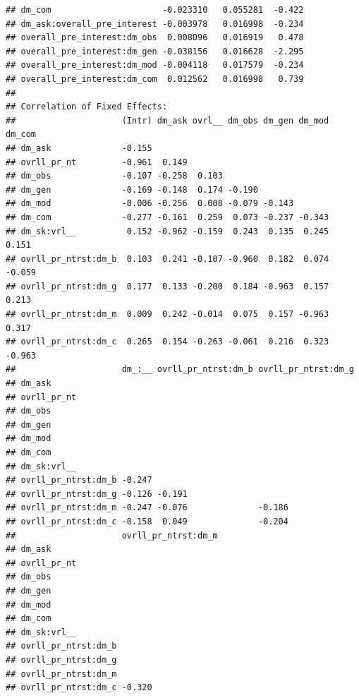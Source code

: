 \documentclass[]{msu-thesis}
\theoremstyle{definition}
\theoremstyle{definition}
\theoremstyle{definition}
\theoremstyle{remark}
\begin{document}
\begin{verbatim}
## dm_com                      -0.023310   0.055281  -0.422
## dm_ask:overall_pre_interest -0.003978   0.016998  -0.234
## overall_pre_interest:dm_obs  0.008096   0.016919   0.478
## overall_pre_interest:dm_gen -0.038156   0.016628  -2.295
## overall_pre_interest:dm_mod -0.004118   0.017579  -0.234
## overall_pre_interest:dm_com  0.012562   0.016998   0.739
## 
## Correlation of Fixed Effects:
##                     (Intr) dm_ask ovrl__ dm_obs dm_gen dm_mod dm_com
## dm_ask              -0.155                                          
## ovrll_pr_nt         -0.961  0.149                                   
## dm_obs              -0.107 -0.258  0.103                            
## dm_gen              -0.169 -0.148  0.174 -0.190                     
## dm_mod              -0.006 -0.256  0.008 -0.079 -0.143              
## dm_com              -0.277 -0.161  0.259  0.073 -0.237 -0.343       
## dm_sk:vrl__          0.152 -0.962 -0.159  0.243  0.135  0.245  0.151
## ovrll_pr_ntrst:dm_b  0.103  0.241 -0.107 -0.960  0.182  0.074 -0.059
## ovrll_pr_ntrst:dm_g  0.177  0.133 -0.200  0.184 -0.963  0.157  0.213
## ovrll_pr_ntrst:dm_m  0.009  0.242 -0.014  0.075  0.157 -0.963  0.317
## ovrll_pr_ntrst:dm_c  0.265  0.154 -0.263 -0.061  0.216  0.323 -0.963
##                     dm_:__ ovrll_pr_ntrst:dm_b ovrll_pr_ntrst:dm_g
## dm_ask                                                            
## ovrll_pr_nt                                                       
## dm_obs                                                            
## dm_gen                                                            
## dm_mod                                                            
## dm_com                                                            
## dm_sk:vrl__                                                       
## ovrll_pr_ntrst:dm_b -0.247                                        
## ovrll_pr_ntrst:dm_g -0.126 -0.191                                 
## ovrll_pr_ntrst:dm_m -0.247 -0.076              -0.186             
## ovrll_pr_ntrst:dm_c -0.158  0.049              -0.204             
##                     ovrll_pr_ntrst:dm_m
## dm_ask                                 
## ovrll_pr_nt                            
## dm_obs                                 
## dm_gen                                 
## dm_mod                                 
## dm_com                                 
## dm_sk:vrl__                            
## ovrll_pr_ntrst:dm_b                    
## ovrll_pr_ntrst:dm_g                    
## ovrll_pr_ntrst:dm_m                    
## ovrll_pr_ntrst:dm_c -0.320             

\end{verbatim}
\end{document}
